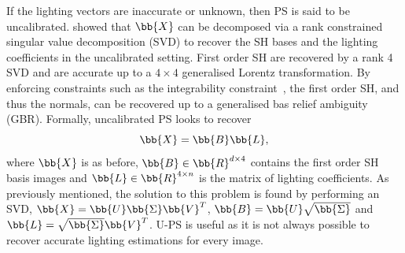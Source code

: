 If the lighting vectors are inaccurate or unknown, then PS is said to be
uncalibrated. \citet{basri2007photometric} showed that $\bb{X}$ can
be decomposed via a rank constrained singular value decomposition (SVD) to
recover the SH bases and the lighting coefficients in the uncalibrated setting.
First order SH are recovered by a rank 4 SVD and are accurate up to a $4 \times 4$
generalised Lorentz transformation. By enforcing constraints such as the
integrability constraint~\cite{frankot1988method}, the first order SH, and thus the
normals, can be recovered up to a generalised bas relief ambiguity (GBR).
Formally, uncalibrated PS looks to recover
\begin{equation}\label{eq:uncalibrated_ps}
    \bb{X} = \bb{B} \bb{L},
\end{equation}
where $\bb{X}$ is as before, $\bb{B} \in \bb{R}^{d \times 4}$
contains the first order SH basis images and
$\bb{L} \in \bb{R}^{4 \times n}$ is the matrix of lighting coefficients.
As previously mentioned, the solution to this problem is found by performing an
SVD,
$\bb{X} =\nobreak \bb{U} \bb{\Sigma} \bb{V}^T$, $\bb{B} = \bb{U} \sqrt{\bb{\Sigma}}$
and $\bb{L} = \sqrt{\bb{\Sigma}} \bb{V}^T$.
U-PS is useful as it is not always possible to recover accurate
lighting estimations for every image.
